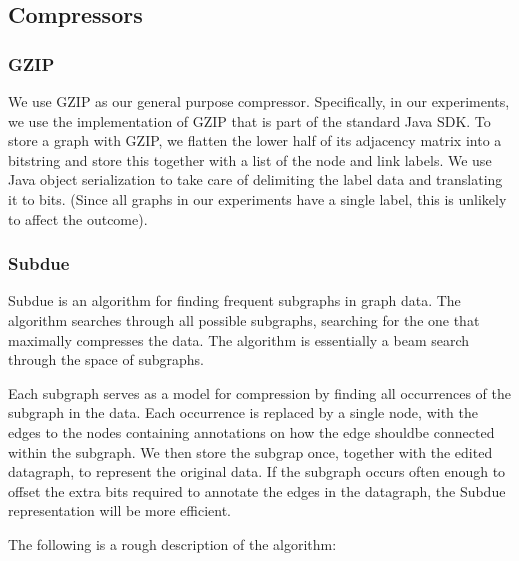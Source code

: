 \documentclass{article}
\begin{document}

\subsection*{Compressors}

\subsubsection*{GZIP}

We use GZIP as our general purpose compressor. Specifically, in our experiments, we use the implementation of GZIP that is part of the standard Java SDK. To store a graph with GZIP, we flatten the lower half of its adjacency matrix into a bitstring and store this together with a list of the node and link labels. We use Java object serialization to take care of delimiting the label data and translating it to bits. (Since all graphs in our experiments have a single label, this is unlikely to affect the outcome).

\subsubsection*{Subdue}

Subdue \cite{ketkar2005subdue} is an algorithm for finding frequent subgraphs in graph data. The algorithm searches through all possible subgraphs, searching for the  one that maximally compresses the data. The algorithm is essentially a beam search through the space of subgraphs. 

Each subgraph serves as a model for compression by finding all occurrences of the subgraph in the data. Each occurrence is replaced by a single node, with the edges to the nodes containing annotations on how the edge shouldbe connected within the subgraph. We then store the subgrap once, together with the edited datagraph, to represent the original data. If the subgraph occurs often enough to offset the extra bits required to annotate the edges in the datagraph, the Subdue representation will be more efficient.

The following is a rough description of the algorithm:
\end{document}
